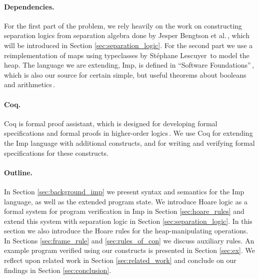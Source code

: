 \paragraph{Dependencies.}
For the first part of the problem, we rely heavily on the work on constructing separation logics from separation algebra done by Jesper Bengtson et al.\,\cite{BirkedalL:veroop-conf}, which will be introduced in Section \ref{sec:separation_logic}. For the second part we use a reimplementation of maps using typeclasses by Stéphane Lescuyer\,\cite{CoqContainers} to model the heap. The language we are extending, Imp, is defined in ``Software Foundations''\,\cite{Pierce:SF}, which is also our source for certain simple, but useful theorems about booleans and arithmetics\,\cite{SfLib}.

\paragraph{Coq.}
Coq is formal proof assistant, which is designed for developing formal specifications and formal proofs in higher-order logics\,\cite{CoqIntro}. We use Coq for extending the Imp language with additional constructs, and for writing and verifying formal specifications for these constructs.

\paragraph{Outline.}
In Section \ref{sec:background_imp} we present syntax and semantics for the Imp language, as well as the extended program state. We introduce Hoare logic as a formal system for program verification in Imp in Section \ref{sec:hoare_rules} and extend this system with separation logic in Section \ref{sec:separation_logic}. In this section we also introduce the Hoare rules for the heap-manipulating operations. In Sections \ref{sec:frame_rule} and \ref{sec:rules_of_con} we discuss auxiliary rules. An example program verified using our constructs is presented in Section \ref{sec:ex}. We reflect upon related work in Section \ref{sec:related_work} and conclude on our findings in Section \ref{sec:conclusion}.